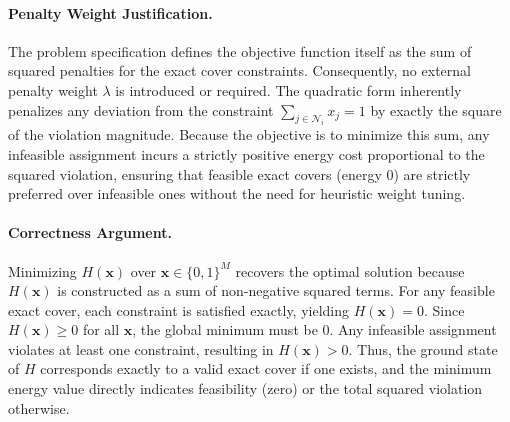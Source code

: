 \documentclass[12pt]{article}
\begin{document}
\paragraph{Penalty Weight Justification.}
The problem specification defines the objective function itself as the sum of squared penalties for the exact cover constraints. Consequently, no external penalty weight $\lambda$ is introduced or required. The quadratic form inherently penalizes any deviation from the constraint $\sum_{j \in \mathcal{N}_i} x_j = 1$ by exactly the square of the violation magnitude. Because the objective is to minimize this sum, any infeasible assignment incurs a strictly positive energy cost proportional to the squared violation, ensuring that feasible exact covers (energy $0$) are strictly preferred over infeasible ones without the need for heuristic weight tuning.

\paragraph{Correctness Argument.}
Minimizing $H(\mathbf{x})$ over $\mathbf{x} \in \{0,1\}^M$ recovers the optimal solution because $H(\mathbf{x})$ is constructed as a sum of non-negative squared terms. For any feasible exact cover, each constraint is satisfied exactly, yielding $H(\mathbf{x}) = 0$. Since $H(\mathbf{x}) \geq 0$ for all $\mathbf{x}$, the global minimum must be $0$. Any infeasible assignment violates at least one constraint, resulting in $H(\mathbf{x}) > 0$. Thus, the ground state of $H$ corresponds exactly to a valid exact cover if one exists, and the minimum energy value directly indicates feasibility (zero) or the total squared violation otherwise.
\end{document}
